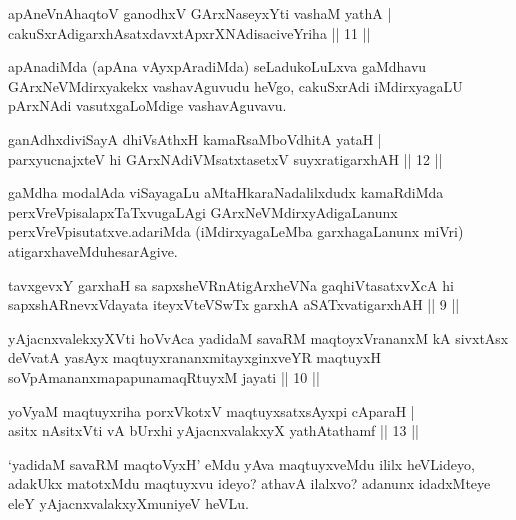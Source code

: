 \begin{shl}
apAneVnA\s \s haqtoV ganodhxV GArxNaseyxYti vashaM yathA |\\
cakuSxrAdigarxhAsatxdavxtApxrXNAdisaciveYriha \hfill || 11 ||
\end{shl}

\begin{artha}
apAnadiMda (apAna vAyxpAradiMda) seLadukoLuLxva gaMdhavu GArxNeVMdirxyakekx vashavAguvudu heVgo, cakuSxrAdi iMdirxyagaLU pArxNAdi vasutxgaLoMdige vashavAguvavu.
\end{artha}

\begin{shl}
ganAdhxdiviSayA dhiVsAthxH kamaRsaMboVdhitA yataH |\\
parxyucnajxteV hi GArxNAdiVMsatxtasetxV suyxratigarxhAH \hfill || 12 ||
\end{shl}

\begin{artha}
gaMdha modalAda viSayagaLu aMtaHkaraNadalilxdudx kamaRdiMda perxVreVpisalapxTaTxvugaLAgi GArxNeVMdirxyAdigaLanunx perxVreVpisutatxve.\break adariMda (iMdirxyagaLeMba garxhagaLanunx miVri) atigarxhaveMdu\break hesarAgive.
\end{artha}


\begin{kandikeshl}
tavxgevxY garxhaH sa sapxsheVRnAtigArxheVNa gaqhiVtasatxvXcA hi sapxshARnevxVdayata iteyxVteV\s SwTx garxhA aSATxvatigarxhAH || 9 ||

yAjacnxvalekxyXVti hoVvAca yadidaM savaRM maqtoyxVrananxM kA sivxtAsx deVvatA yasAyx maqtuyxrananxmitayxginxveYR maqtuyxH soV\s pAmananxmapa\break punamaqRtuyxM jayati || 10 ||
\end{kandikeshl}


\begin{shl}
yoV\s yaM maqtuyxriha porxVkotxV maqtuyxsatxsAyxpi cAparaH |\\
asitx nAsitxVti vA bUrxhi yAjacnxvalakxyX yathAtathamf \hfill || 13 ||
\end{shl}

\begin{artha}
`yadidaM savaRM maqtoVyxH' eMdu yAva maqtuyxveMdu ililx heVLideyo, adakUkx matotxMdu maqtuyxvu ideyo? athavA ilalxvo? adanunx idadxMteye eleY yAjacnxvalakxyXmuniyeV heVLu.
\end{artha}

